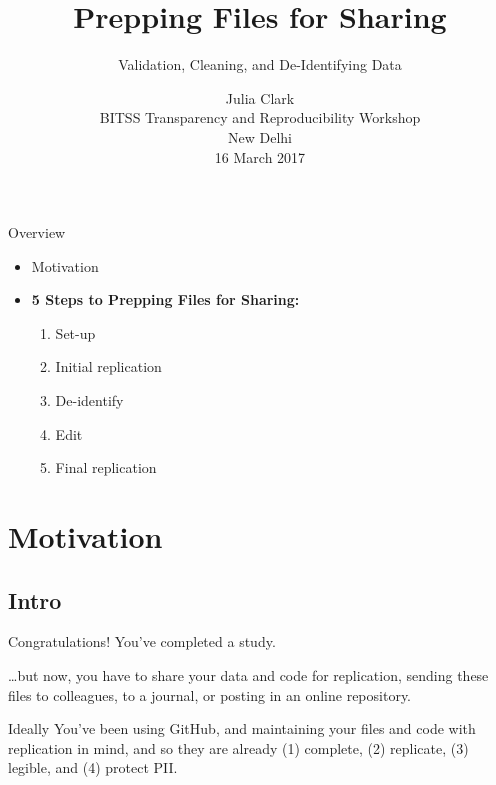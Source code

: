 \documentclass[12pt, compress]{beamer} %
\title[Short Title]{Prepping Files for Sharing}
\subtitle{Validation, Cleaning, and De-Identifying Data \vspace{-20pt} }
\institute{\vspace{10pt} \texttt{[image: images/pdel.png]}\vspace{10pt} \texttt{[image: images/UCSDlogo]}}
\date[Short Occasion]{Julia Clark \\ BITSS Transparency and Reproducibility Workshop \\ New Delhi \\ 16 March 2017}
\let\olditem\item %
\renewcommand{\item}{%
\olditem\vspace{\fill}}
\begin{document}

{ %
\frame{
  \titlepage
  \note{}
  }
}


	{ %
	
	\begin{frame}{Overview}
		
		\begin{itemize}
			\item Motivation
			\item \textbf{5 Steps to Prepping Files for Sharing:}
			\begin{enumerate}
				\item Set-up
				\item Initial replication
				\item De-identify
				\item Edit
				\item Final replication
			\end{enumerate}
		\end{itemize}
		
	\end{frame}
	}

\section{Motivation}

\subsection{Intro}

	\begin{frame}{Congratulations!}
		\centering
		You've completed a study.
		\bigskip
		\bigskip
		
		
		\dots	 but now, you have to share your data and code for replication, sending these files to colleagues, to a journal, or posting in an online repository.
	\end{frame}

	\begin{frame}{Ideally}
		\centering
		You've been using GitHub, and maintaining your files and code with replication in mind, and so they are already \textcolor{burntorange}{(1) complete, (2) replicate, (3) legible,} and \textcolor{burntorange}{(4) protect PII}.
	\end{frame}
	
\end{document}
